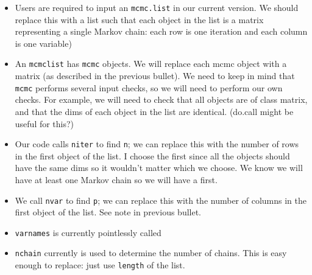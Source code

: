\documentclass[12pt]{article}
\theoremstyle{remark}
\begin{document}
\begin{itemize}
 \renewcommand{\labelitemi}{$\square$}
\item Users are required to input an \texttt{mcmc.list} in our current version. We should replace this with a list such that each object in the list is a matrix representing a single Markov chain: each row is one iteration and each column is one variable)
\item An \texttt{mcmclist} has \texttt{mcmc} objects. We will replace each mcmc object with a matrix (as described in the previous bullet). We need to keep in mind that \texttt{mcmc} performs several input checks, so we will need to perform our own checks. For example, we will need to check that all objects are of class matrix, and that the dims of each object in the list are identical. (do.call might be useful for this?)

\item Our code calls \texttt{niter} to find \texttt{n}; we can replace this with the number of rows in the first object of the list. I choose the first since all the objects should have the same dims so it wouldn't matter which we choose. We know we will have at least one Markov chain so we will have a first.
\item We call \texttt{nvar} to find \texttt{p}; we can replace this with the number of columns in the first object of the list. See note in previous bullet.
\item \texttt{varnames} is currently pointlessly called
\item \texttt{nchain} currently is used to determine the number of chains. This is easy enough to replace: just use \texttt{length} of the list.
\end{itemize}










\end{document}
